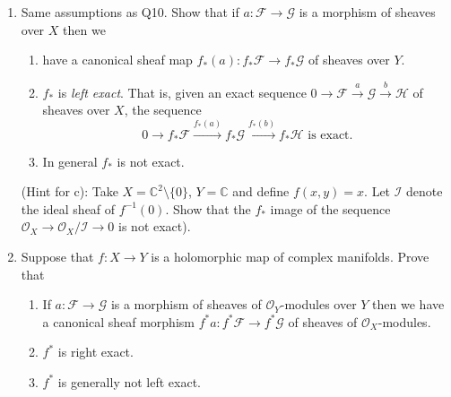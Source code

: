 \begin{enumerate}
\begin{enumerate}[label=\alph*)]
\item If $a:\mathcal F\to\mathcal G$ is a morphism of sheaves over $Y$ then we have a canonical sheaf map $f^{-1}(a):f^{-1}\mathcal F\to f^{-1}\mathcal G$ of sheaves over $X$.
\item $f^{-1}$ is \emph{exact}. That is, given a short exact sequence $0\to\mathcal F\xrightarrow a\mathcal G\xrightarrow b\mathcal H\to0$ of sheaves over $Y$, the sequence
\[
0\to f^{-1}\mathcal F\xrightarrow{f^{-1}(a)}f^{-1}\mathcal G\xrightarrow{f^{-1}(b)}f^{-1}\mathcal H\to0\text{ is exact.}
\]
\end{enumerate}
\item Same assumptions as Q10. Show that if $a:\mathcal F\to\mathcal G$ is a morphism of sheaves over $X$ then we
\begin{enumerate}[label=\alph*)]
\item have a canonical sheaf map $f_*(a):f_*\mathcal F\to f_*\mathcal G$ of sheaves over $Y$.
\item $f_*$ is \emph{left exact}. That is, given an exact sequence $0\to\mathcal F\xrightarrow a\mathcal G\xrightarrow b\mathcal H$ of sheaves over $X$, the sequence
\[
0\to f_*\mathcal F\xrightarrow{f_*(a)}f_*\mathcal G\xrightarrow{f_*(b)}f_*\mathcal H\text{ is exact.}
\]
\item In general $f_*$ is not exact.
\end{enumerate}
(Hint for c): Take $X=\mathbb C^2\setminus\{0\}$, $Y=\mathbb C$ and define $f(x,y)=x$. Let $\mathcal I$ denote the ideal sheaf of $f^{-1}(0)$. Show that the $f_*$ image of the sequence $\mathcal O_X\to\mathcal O_X/\mathcal I\to0$ is not exact).
\item Suppose that $f:X\to Y$ is a holomorphic map of complex manifolds. Prove that
\begin{enumerate}[label=\alph*)]
\item If $a:\mathcal F\to\mathcal G$ is a morphism of sheaves of $\mathcal O_Y$-modules over $Y$ then we have a canonical sheaf morphism $f^*a:f^*\mathcal F\to f^*\mathcal G$ of sheaves of $\mathcal O_X$-modules.
\item $f^*$ is right exact.
\item $f^*$ is generally not left exact.
\end{enumerate}

\end{enumerate}
